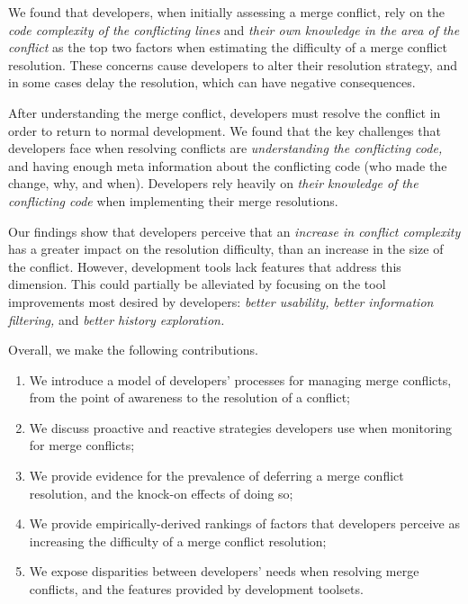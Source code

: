 We found that developers, when initially assessing a merge conflict, rely on the \textit{code complexity of the conflicting lines} and \textit{their own knowledge in the area of the conflict} as the top two factors when estimating the difficulty of a merge conflict resolution.
These concerns cause developers to alter their resolution strategy, and in some cases delay the resolution, which can have negative consequences.

After understanding the merge conflict, developers must resolve the conflict in order to return to normal development.
We found that the key challenges that developers face when resolving conflicts are \textit{understanding the conflicting code,} and having enough meta information about the conflicting code (who made the change, why, and when).
Developers rely heavily on \textit{their knowledge of the conflicting code} when implementing their merge resolutions.

Our findings show that developers perceive that an \textit{increase in conflict complexity} has a greater impact on the resolution difficulty, than an increase in the size of the conflict.
However, development tools lack features that address this dimension.
This could partially be alleviated by focusing on the tool improvements most desired by developers: \textit{better usability, better information filtering,} and \textit{better history exploration.}


Overall, we make the following contributions.
\begin{enumerate}
\item We introduce a model of developers' processes for managing merge conflicts, from the point of awareness to the resolution of a conflict;
\item We discuss proactive and reactive strategies developers use when monitoring for merge conflicts;
\item We provide evidence for the prevalence of deferring a merge conflict resolution, and the knock-on effects of doing so;
\item We provide empirically-derived rankings of factors that developers perceive as increasing the difficulty of a merge conflict resolution;
\item We expose disparities between developers' needs when resolving merge conflicts, and the features provided by development toolsets.
\end{enumerate}

